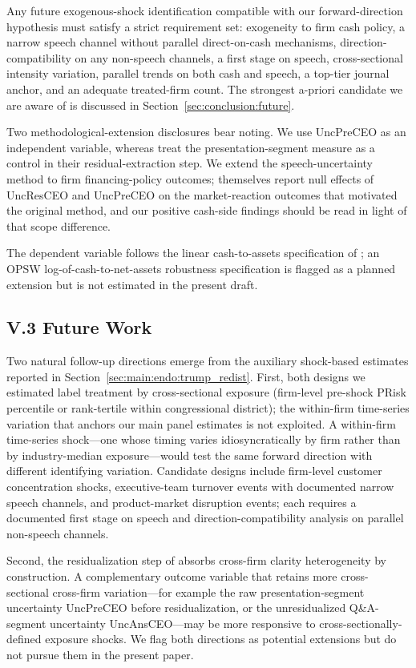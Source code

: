 Any future exogenous-shock identification compatible with our forward-direction hypothesis must satisfy a strict requirement set: exogeneity to firm cash policy, a narrow speech channel without parallel direct-on-cash mechanisms, direction-compatibility on any non-speech channels, a first stage on speech, cross-sectional intensity variation, parallel trends on both cash and speech, a top-tier journal anchor, and an adequate treated-firm count. The strongest a-priori candidate we are aware of is discussed in Section~\ref{sec:conclusion:future}.

Two methodological-extension disclosures bear noting. We use UncPreCEO as an independent variable, whereas  treat the presentation-segment measure as a control in their residual-extraction step. We extend the speech-uncertainty method to firm financing-policy outcomes;  themselves report null effects of UncResCEO and UncPreCEO on the market-reaction outcomes that motivated the original method, and our positive cash-side findings should be read in light of that scope difference.

The dependent variable follows the linear cash-to-assets specification of ; an OPSW log-of-cash-to-net-assets robustness specification is flagged as a planned extension but is not estimated in the present draft.

\subsection*{V.3 Future Work}
\label{sec:conclusion:future}

Two natural follow-up directions emerge from the auxiliary shock-based estimates reported in Section~\ref{sec:main:endo:trump_redist}. First, both designs we estimated label treatment by cross-sectional exposure (firm-level pre-shock PRisk percentile or rank-tertile within congressional district); the within-firm time-series variation that anchors our main panel estimates is not exploited. A within-firm time-series shock---one whose timing varies idiosyncratically by firm rather than by industry-median exposure---would test the same forward direction with different identifying variation. Candidate designs include firm-level customer concentration shocks, executive-team turnover events with documented narrow speech channels, and product-market disruption events; each requires a documented first stage on speech and direction-compatibility analysis on parallel non-speech channels.

Second, the residualization step of  absorbs cross-firm clarity heterogeneity by construction. A complementary outcome variable that retains more cross-sectional cross-firm variation---for example the raw presentation-segment uncertainty UncPreCEO before residualization, or the unresidualized Q\&A-segment uncertainty UncAnsCEO---may be more responsive to cross-sectionally-defined exposure shocks. We flag both directions as potential extensions but do not pursue them in the present paper.
